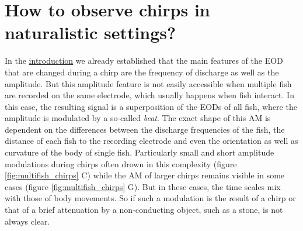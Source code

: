\section{How to observe chirps in naturalistic settings?} %
\label{sec:chirps}

In the \hyperref[chap:intro]{introduction} we already established that the main
features of the \acrshort{EOD} that are changed during a chirp are the
frequency of discharge as well as the amplitude. But this amplitude feature is
not easily accessible when multiple fish are recorded on the same electrode,
which usually happens when fish interact. In this case, the resulting signal is
a superposition of the EODs of all fish, where the amplitude is modulated by a
so-called \emph{beat}. The exact shape of this \acrfull{AM} is dependent on the
differences between the discharge frequencies of the fish, the distance of each
fish to the recording electrode and even the orientation as well as curvature
of the body of single fish. Particularly small and short amplitude modulations
during chirps often drown in this complexity (figure \ref{fig:multifish_chirps}
C) while the AM of larger chirps remains visible in some cases (figure
\ref{fig:multifish_chirps} G). But in these cases, the time scales mix with
those of body movements. So if such a modulation is the result of a chirp or
that of a brief attenuation by a non-conducting object, such as a stone, is not
always clear.

